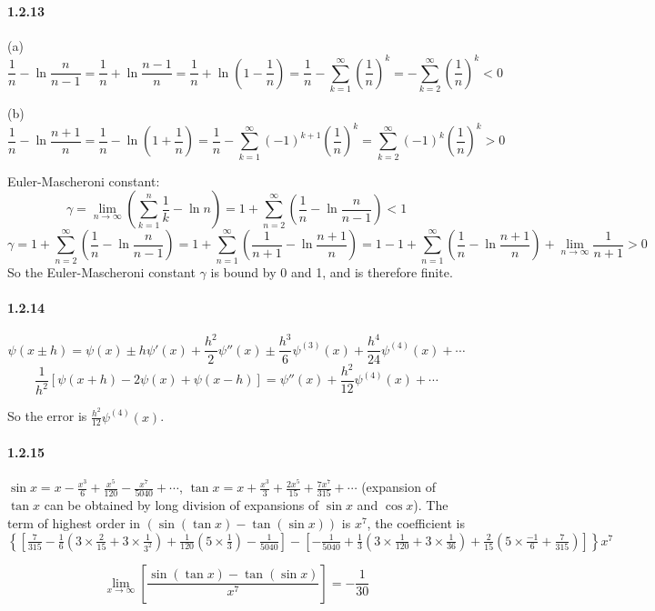 \documentclass[a4paper]{article}
\begin{document}
\paragraph{1.2.13}
(a) \[\frac{1}{n}-\ln{\frac{n}{n-1}}=\frac{1}{n}+\ln{\frac{n-1}{n}}=\frac{1}{n}+
\ln{(1-\frac{1}{n})}=\frac{1}{n}-\sum_{k=1}^\infty(\frac{1}{n})^k=-\sum_{k=2}^\infty(\frac{1}{n})^k<0\]

(b) \[\frac{1}{n}-\ln{\frac{n+1}{n}}=\frac{1}{n}-\ln{(1+\frac{1}{n})}=\frac{1}{n}-\sum_{k=1}^\infty(-1)^{k+1}(\frac{1}{n})^k=\sum_{k=2}^\infty(-1)^k(\frac{1}{n})^k>0\]

Euler-Mascheroni constant:
\[\gamma=\lim_{n\to\infty}\left(\sum_{k=1}^n\frac{1}{k}-\ln{n}\right)=1+\sum_{n=2}^\infty(\frac{1}{n}-\ln{\frac{n}{n-1}})<1\]
\[\gamma=1+\sum_{n=2}^\infty(\frac{1}{n}-\ln{\frac{n}{n-1}})=1+\sum_{n=1}^\infty(\frac{1}{n+1}-\ln{\frac{n+1}{n}})=1-1+\sum_{n=1}^\infty(\frac{1}{n}-\ln{\frac{n+1}{n}})+\lim_{n\to\infty}\frac{1}{n+1}>0\]
So the Euler-Mascheroni constant $\gamma$ is bound by 0 and 1, and is therefore finite.

\paragraph{1.2.14}
\[\psi(x\pm h)=\psi(x)\pm h\psi'(x)+\frac{h^2}{2}\psi''(x)\pm \frac{h^3}{6}\psi^{(3)}(x)+\frac{h^4}{24}\psi^{(4)}(x)+\cdots\]
\[\frac{1}{h^2}\left[\psi(x+h)-2\psi(x)+\psi(x-h)\right]=\psi''(x)+\frac{h^2}{12}\psi^{(4)}(x)+\cdots\]

So the error is $\frac{h^2}{12}\psi^{(4)}(x)$.

\paragraph{1.2.15}
$\sin{x}=x-\frac{x^3}{6}+\frac{x^5}{120}-\frac{x^7}{5040}+\cdots$, $\tan{x}=x+\frac{x^3}{3}+\frac{2x^5}{15}+\frac{7x^7}{315}+\cdots$ (expansion of $\tan{x}$ can be obtained by long division of expansions of $\sin{x}$ and $\cos{x}$).
The term of highest order in $(\sin{(\tan{x})}-\tan{(\sin{x})})$ is $x^7$, the coefficient is \\
$\left\{\left[\frac{7}{315}-\frac{1}{6}\left(3\times\frac{2}{15}+3\times\frac{1}{3^2}\right)+\frac{1}{120}\left(5\times\frac{1}{3}\right)-\frac{1}{5040}\right]-\left[-\frac{1}{5040}+\frac{1}{3}\left(3\times\frac{1}{120}+3\times\frac{1}{36}\right)+\frac{2}{15}\left(5\times\frac{-1}{6}+\frac{7}{315} \right)\right]\right\}x^7$

\[\lim_{x\to\infty}\left[\frac{\sin{(\tan{x})}-\tan{(\sin{x})}}{x^7} \right]=-\frac{1}{30}\]
\end{document}
